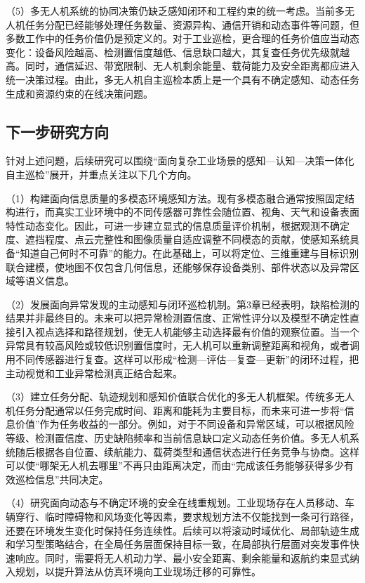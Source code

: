 （5）多无人机系统的协同决策仍缺乏感知闭环和工程约束的统一考虑。当前多无人机任务分配已经能够处理任务数量、资源异构、通信开销和动态事件等问题，但多数工作中的任务价值仍是预定义的。对于工业巡检，更合理的任务价值应当动态变化：设备风险越高、检测置信度越低、信息缺口越大，其复查任务优先级就越高。同时，通信延迟、带宽限制、无人机剩余能量、载荷能力及安全距离都应进入统一决策过程。由此，多无人机自主巡检本质上是一个具有不确定感知、动态任务生成和资源约束的在线决策问题。

\subsection{下一步研究方向}

针对上述问题，后续研究可以围绕“面向复杂工业场景的感知—认知—决策一体化自主巡检”展开，并重点关注以下几个方向。

（1）构建面向信息质量的多模态环境感知方法。现有多模态融合通常按照固定结构进行，而真实工业环境中的不同传感器可靠性会随位置、视角、天气和设备表面特性动态变化。因此，可进一步建立显式的信息质量评价机制，根据观测不确定度、遮挡程度、点云完整性和图像质量自适应调整不同模态的贡献，使感知系统具备“知道自己何时不可靠”的能力。在此基础上，可以将定位、三维重建与目标识别联合建模，使地图不仅包含几何信息，还能够保存设备类别、部件状态以及异常区域等语义信息。

（2）发展面向异常发现的主动感知与闭环巡检机制。第3章已经表明，缺陷检测的结果并非最终目的。未来可以把异常检测置信度、正常性评分以及模型不确定性直接引入视点选择和路径规划，使无人机能够主动选择最有价值的观察位置。当一个异常具有较高风险或较低识别置信度时，无人机可以重新调整距离和视角，或者调用不同传感器进行复查。这样可以形成“检测—评估—复查—更新”的闭环过程，把主动视觉和工业异常检测真正结合起来。

（3）建立任务分配、轨迹规划和感知价值联合优化的多无人机框架。传统多无人机任务分配通常以任务完成时间、距离和能耗为主要目标，而未来可进一步将“信息价值”作为任务收益的一部分。例如，对于不同设备和异常区域，可以根据风险等级、检测置信度、历史缺陷频率和当前信息缺口定义动态任务价值。多无人机系统随后根据各自位置、续航能力、载荷类型和通信状态进行任务竞争与协商。这样可以使“哪架无人机去哪里”不再只由距离决定，而由“完成该任务能够获得多少有效巡检信息”共同决定。

（4）研究面向动态与不确定环境的安全在线重规划。工业现场存在人员移动、车辆穿行、临时障碍物和风场变化等因素，要求规划方法不仅能找到一条可行路径，还要在环境发生变化时保持任务连续性。后续可以将滚动时域优化、局部轨迹生成和学习型策略结合，在全局任务层面保持目标一致，在局部执行层面对突发事件快速响应。同时，需要将无人机动力学、最小安全距离、剩余能量和返航约束显式纳入规划，以提升算法从仿真环境向工业现场迁移的可靠性。

